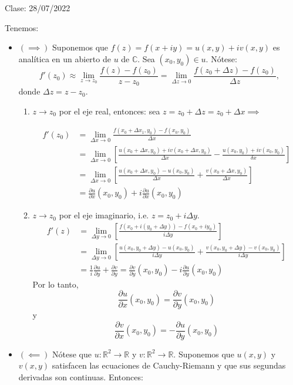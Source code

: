 Clase: 28/07/2022


\begin{dem}
    Tenemos:
    \begin{itemize}
        \item $(\implies)$ Suponemos que $f(z)=f(x+iy)=u(x,y)+iv(x,y)$ es analítica en un abierto de $u$ de $\mathbb{C}$. Sea $(x_0,y_0)\in u$. Nótese: 
        $$f'(z_0)\approx \lim_{z\to z_0}\frac{f(z)-f(z_0)}{z-z_0}=\lim_{\Delta z\to 0}\frac{f(z_0+\Delta z)-f(z_0)}{\Delta z},$$
        donde $\Delta z=z-z_0$.
        \begin{enumerate}
            \item $z\to z_0$ por el eje real, entonces: sea $z=z_0+\Delta z=z_0+\Delta x\implies$ 
            
            \begin{align*}
                f'(z_0) &=\lim_{\Delta x\to 0}\frac{f(x_0+\Delta x_1,y_0)-f(x_0,y_0)}{\Delta x}\\
                &= \lim_{\Delta x\to 0}\left[\frac{u(x_0+\Delta x,y_0)+iv(x_0+\Delta x, y_0)}{\Delta x}-\frac{u(x_0,y_0)+iv(x_0,y_0)}{\delta x}\right]\\
                &= \lim_{\Delta x\to 0}\left[\frac{u(x_0+\Delta x,y_0)-u(x_0,y_0)}{\Delta x}+\frac{v(x_0+\Delta x,y_0)}{\Delta x}\right]\\
                &=\frac{\partial u}{\partial x}(x_0,y_0)+i\frac{\partial u}{\partial x}(x_0,y_0)
            \end{align*}
           \item $z\to z_0$ por el eje imaginario, i.e. $z=z_0+i\Delta y$. 
           \begin{align*}
                f'(z)& =\lim_{\Delta y\to 0}\left[\frac{f(x_0+i(y_0+\Delta y))-f(x_0+iy_0)}{i\Delta y}\right]\\ 
                &= \lim_{\Delta y\to 0}\left[\frac{u(x_0,y_0+\Delta y)-u(x_0,y_0)}{i\Delta y}+\frac{v(x_0,y_0+\Delta y)- v(x_0,y_0)}{i\Delta y}\right]\\
                &= \frac{1}{i}\frac{\partial u}{\partial y}+\frac{\partial v}{\partial y} = \frac{\partial v}{\partial y}(x_0,y_0)-i\frac{\partial u}{\partial y}(x_0,y_0)
           \end{align*}
           Por lo tanto, 
           $$\frac{\partial u}{\partial x}(x_0,y_0)=\frac{\partial v}{\partial y}(x_0,y_0)$$
           y 
           $$\frac{\partial v}{\partial x}(x_0,y_0)=-\frac{\partial u}{\partial y}(x_0,y_0)$$
        \end{enumerate}
        \item $(\impliedby)$ Nótese que $u:\mathbb{R}^2\to \mathbb{R}$ y $v:\mathbb{R}^2\to \mathbb{R}$. Suponemos que $u(x,y)$ y $v(x,y)$ satisfacen las ecuaciones de Cauchy-Riemann y que sus segundas derivadas son continuas. Entonces: 

\end{itemize}
\end{dem}
